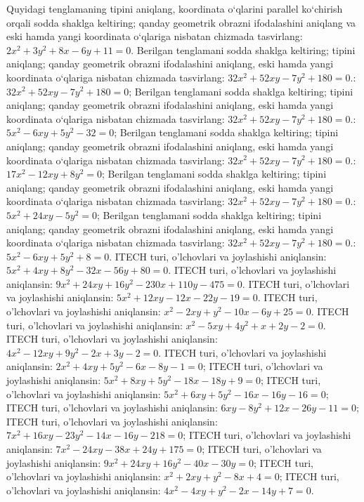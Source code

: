 Quyidagi tenglamaning tipini aniqlang, koordinata o‘qlarini parallel ko‘chirish orqali sodda shaklga keltiring; qanday geometrik obrazni ifodalashini aniqlang va eski hamda yangi koordinata o‘qlariga nisbatan chizmada tasvirlang: $2 x^2+3 y^2+8 x-6 y+11=0$.
Berilgan tenglamani sodda shaklga keltiring; tipini aniqlang; qanday geometrik obrazni ifodalashini aniqlang, eski hamda yangi koordinata o‘qlariga nisbatan chizmada tasvirlang: $32x^2+52xy-7y^2+180=0$.: $32 x^2+52 x y-7 y^2+180=0$;
Berilgan tenglamani sodda shaklga keltiring; tipini aniqlang; qanday geometrik obrazni ifodalashini aniqlang, eski hamda yangi koordinata o‘qlariga nisbatan chizmada tasvirlang: $32x^2+52xy-7y^2+180=0$.: $5 x^2-6 x y+5 y^2-32=0$;
Berilgan tenglamani sodda shaklga keltiring; tipini aniqlang; qanday geometrik obrazni ifodalashini aniqlang, eski hamda yangi koordinata o‘qlariga nisbatan chizmada tasvirlang: $32x^2+52xy-7y^2+180=0$.: $17 x^2-12 x y+8 y^2=0$;
Berilgan tenglamani sodda shaklga keltiring; tipini aniqlang; qanday geometrik obrazni ifodalashini aniqlang, eski hamda yangi koordinata o‘qlariga nisbatan chizmada tasvirlang: $32x^2+52xy-7y^2+180=0$.: $5 x^2+24 x y-5 y^2=0$;
Berilgan tenglamani sodda shaklga keltiring; tipini aniqlang; qanday geometrik obrazni ifodalashini aniqlang, eski hamda yangi koordinata o‘qlariga nisbatan chizmada tasvirlang: $32x^2+52xy-7y^2+180=0$.: $5 x^2-6 x y+5 y^2+8=0$.
ITECH turi, o'lchovlari va joylashishi aniqlansin: $5 x^2+4 x y+8 y^2-32 x-56 y+80=0$.
ITECH turi, o'lchovlari va joylashishi aniqlansin: $9 x^2+24 x y+16 y^2-230 x+110 y-475=0$.
ITECH turi, o'lchovlari va joylashishi aniqlansin: $5 x^2+12 x y-12 x-22 y-19=0$.
ITECH turi, o'lchovlari va joylashishi aniqlansin: $x^2-2 x y+y^2-10 x-6 y+25=0$.
ITECH turi, o'lchovlari va joylashishi aniqlansin: $x^2-5 x y+4 y^2+x+2 y-2=0$.
ITECH turi, o'lchovlari va joylashishi aniqlansin: $4 x^2-12 x y+9 y^2-2 x+3 y-2=0$.
ITECH turi, o'lchovlari va joylashishi aniqlansin: $2 x^2+4 x y+5 y^2-6 x-8 y-1=0$;
ITECH turi, o'lchovlari va joylashishi aniqlansin: $5 x^2+8 x y+5 y^2-18 x-18 y+9=0$;
ITECH turi, o'lchovlari va joylashishi aniqlansin: $5 x^2+6 x y+5 y^2-16 x-16 y-16=0$;
ITECH turi, o'lchovlari va joylashishi aniqlansin: $6 x y-8 y^2+12 x-26 y-11=0$;
ITECH turi, o'lchovlari va joylashishi aniqlansin: $7 x^2+16 x y-23 y^2-14 x-16 y-218=0$;
ITECH turi, o'lchovlari va joylashishi aniqlansin: $7 x^2-24 x y-38 x+24 y+175=0$;
ITECH turi, o'lchovlari va joylashishi aniqlansin: $9 x^2+24 x y+16 y^2-40 x-30 y=0$;
ITECH turi, o'lchovlari va joylashishi aniqlansin: $x^2+2 x y+y^2-8 x+4=0$;
ITECH turi, o'lchovlari va joylashishi aniqlansin: $4 x^2-4 x y+y^2-2 x-14 y+7=0$.
